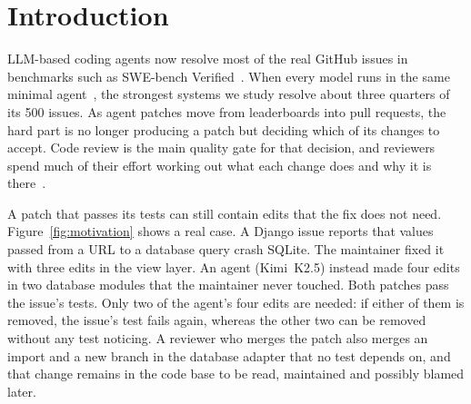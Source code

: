 \documentclass[a4paper,fleqn]{cas-sc}
\begin{document}
\section{Introduction}\label{sec:intro}

LLM-based coding agents now resolve most of the real GitHub issues in benchmarks such as SWE-bench Verified~\citep{jimenez2024swebench,chowdhury2024verified}. When every model runs in the same minimal agent~\citep{miniswe2025}, the strongest systems we study resolve about three quarters of its 500 issues. As agent patches move from leaderboards into pull requests, the hard part is no longer producing a patch but deciding which of its changes to accept. Code review is the main quality gate for that decision, and reviewers spend much of their effort working out what each change does and why it is there~\citep{bacchelli2013expectations}.

A patch that passes its tests can still contain edits that the fix does not need. Figure~\ref{fig:motivation} shows a real case. A Django issue reports that values passed from a URL to a database query crash SQLite. The maintainer fixed it with three edits in the view layer. An agent (Kimi~K2.5) instead made four edits in two database modules that the maintainer never touched. Both patches pass the issue's tests. Only two of the agent's four edits are needed: if either of them is removed, the issue's test fails again, whereas the other two can be removed without any test noticing. A reviewer who merges the patch also merges an import and a new branch in the database adapter that no test depends on, and that change remains in the code base to be read, maintained and possibly blamed later.
\end{document}
